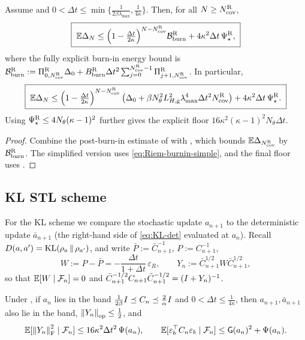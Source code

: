 \begin{corollary}
\label{cor:Riem-STL-closed-global}
Assume  and
$0<\Delta t\leq\min\{\tfrac1{2\beta\lambda_{\max}},\tfrac1{4\kappa}\}$.
Then, for all $N\geq N_{\mathrm{cov}}^{\mathrm{R}}$,
\[
    \boxed{\;
    \mathbb{E}\Delta_N
    \leq
    \Bigl(1-\tfrac{\Delta t}{2\kappa}\Bigr)^{N-N_{\mathrm{cov}}^{\mathrm{R}}}
    \mathcal B_{\mathrm{burn}}^{\mathrm{R}}
    +
    4\kappa^2\Delta t\,\Psi_\star^{\mathrm{R}},
    \;}
\]
where the fully explicit burn-in energy bound is
$\mathcal B_{\mathrm{burn}}^{\mathrm{R}}:=\Pi_{0,N_{\mathrm{cov}}^{\mathrm{R}}}^{\mathrm{R}}\Delta_0+B_{\mathrm{burn}}^{\mathrm{R}}\Delta t^2\sum_{j=0}^{N_{\mathrm{cov}}^{\mathrm{R}}-1}\Pi_{j+1,N_{\mathrm{cov}}^{\mathrm{R}}}^{\mathrm{R}}$.
In particular,
\[
    \boxed{\;
    \mathbb{E}\Delta_N
    \leq
    \Bigl(1-\tfrac{\Delta t}{2\kappa}\Bigr)^{N-N_{\mathrm{cov}}^{\mathrm{R}}}
    \left(
        \Delta_0+
        \beta N_\theta^2L_{H,\mathrm g}^2\lambda_{\max}^4\Delta t^2N_{\mathrm{cov}}^{\mathrm{R}}
    \right)
    +
    4\kappa^2\Delta t\,\Psi_\star^{\mathrm{R}}.
    \;}
\]
Using $\Psi_\star^{\mathrm{R}}\leq4N_\theta(\kappa-1)^2$ further gives the explicit floor
$16\kappa^2(\kappa-1)^2N_\theta\Delta t$.
\end{corollary}

\begin{proof}
Combine the post-burn-in estimate of  with
, which bounds
$\mathbb{E}\Delta_{N_{\mathrm{cov}}^{\mathrm{R}}}$ by $\mathcal B_{\mathrm{burn}}^{\mathrm{R}}$. The simplified version uses
\eqref{eq:Riem-burnin-simple}, and the final floor uses .
\end{proof}

\subsection{KL STL scheme}

For the KL scheme we compare the stochastic update $a_{n+1}$ to the deterministic update
$\bar a_{n+1}$ (the right-hand side of \eqref{eq:KL-det} evaluated at $a_n$). Recall
$D(a,a')=\mathrm{KL}(\rho_a\,\|\,\rho_{a'})$, and write $\bar P:=\bar C_{n+1}^{-1}$, $P:=C_{n+1}^{-1}$,
\[
    W:=P-\bar P=-\frac{\Delta t}{1+\Delta t}\,\varepsilon_R,
    \qquad
    Y_n:=\bar C_{n+1}^{1/2}W\bar C_{n+1}^{1/2},
\]
so that $\mathbb{E}[W\mid\mathcal{F}_n]=0$ and $\bar C_{n+1}^{-1/2}C_{n+1}\bar C_{n+1}^{-1/2}=(I+Y_n)^{-1}$.

\begin{lemma}
\label{lem:KL-pert}
Under , if $a_n$ lies in the band
$\tfrac1{2\beta}I\preceq C_n\preceq\tfrac2\alpha I$ and $0<\Delta t\leq\tfrac1{4\kappa}$, then
$a_{n+1},\bar a_{n+1}$ also lie in the band, $\left\lVert Y_n\right\rVert_{\mathrm{op}}\leq\tfrac12$, and
\[
    \mathbb{E}[\left\lVert Y_n\right\rVert_{\mathrm{F}}^2\mid\mathcal{F}_n]\leq16\kappa^2\Delta t^2\,\Psi(a_n),
    \qquad
    \mathbb{E}[\varepsilon_b^\top C_n\varepsilon_b\mid\mathcal{F}_n]\leq\mathsf{G}(a_n)^2+\Psi(a_n).
\]
\end{lemma}

